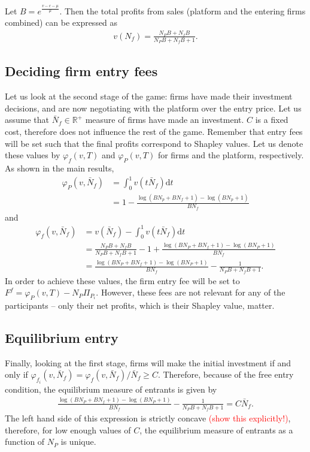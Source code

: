 \documentclass[a4paper]{article}
\newcommand{\dt}{\mathrm{d}t}
\begin{document}
Let $B = e^\frac{v - c - \mu}{\mu}$. Then the total profits from sales (platform and the entering firms combined) can be expressed as
\begin{align*}
    v(N_f) = \frac{N_P B + N_f B}{N_P B + N_f B + 1}.
\end{align*}

\subsection{Deciding firm entry fees}

Let us look at the second stage of the game: firms have made their investment decisions, and are now negotiating with the platform over the entry price. Let us assume that $\bar{N}_f \in \mathbb{R}^+$ measure of firms have made an investment. $C$ is a fixed cost, therefore does not influence the rest of the game. Remember that entry fees will be set such that the final profits correspond to Shapley values. Let us denote these values by $\varphi_f(v, T)$ and $\varphi_P(v, T)$ for firms and the platform, respectively. As shown in the main results,
\begin{align*}
    \varphi_P(v, \bar{N}_f) &= \int_0^1 v(t \bar{N}_f) \dt \\
    &= 1 - \frac{\log(BN_p + BN_f + 1) - \log(BN_p + 1)}{BN_f}
\end{align*}
and
\begin{align*}
    \varphi_f(v, \bar{N}_f) &= v(\bar{N}_f) - \int_0^1 v(t \bar{N}_f) \dt \\
    &= \frac{N_P B + N_f B}{N_P B + N_f B + 1} - 1 + \frac{\log(BN_P + BN_f + 1) - \log(BN_P + 1)}{BN_f} \\
    &= \frac{\log(BN_P + BN_f + 1) - \log(BN_P + 1)}{BN_f} - \frac{1}{N_P B + N_f B + 1}.
\end{align*}
In order to achieve these values, the firm entry fee will be set to $F^f = \varphi_P(v, T) - N_P\Pi_{P_i}$. However, these fees are not relevant for any of the participants -- only their net profits, which is their Shapley value, matter.

\subsection{Equilibrium entry}

Finally, looking at the first stage, firms will make the initial investment if and only if $\varphi_{f_i}(v, \bar{N}_f) = \varphi_f(v, \bar{N}_f) / \bar{N}_f \geq C$. Therefore, because of the free entry condition, the equilibrium measure of entrants is given by
\begin{align*}
    \frac{\log(BN_P + BN_f + 1) - \log(BN_P + 1)}{BN_f} - \frac{1}{N_P B + N_f B + 1} = C \bar{N}_f.
\end{align*}
The left hand side of this expression is strictly concave \textcolor{red}{(show this explicitly!)}, therefore, for low enough values of $C$, the equilibrium measure of entrants as a function of $N_P$ is unique.
\end{document}
